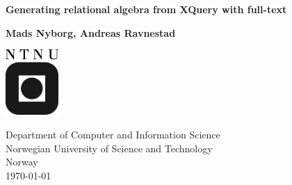 \newpage

\thispagestyle{empty}
\begin{center}
  \vspace*{1cm}
  {\Huge \bf Generating relational algebra from XQuery with full-text}

  \vspace*{2cm}
  {\LARGE\bf Mads Nyborg, Andreas Ravnestad}

  \vfill

  \vspace*{0.9cm}
  
   \begin{center}
   \includegraphics[width=0.15\textwidth]{img/logo_ntnu}
   \end{center}

  {
	  Department of Computer and Information Science\\
	  Norwegian University of Science and Technology\\
	  Norway\\
	  \today}

\end{center}